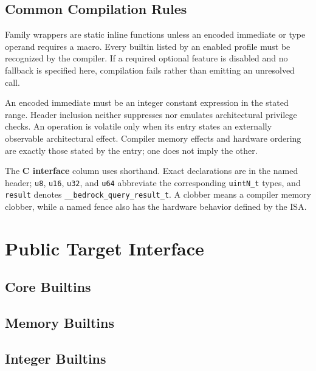 \documentclass[10pt,twoside]{article}
\newcommand{\compilerctype}[1]{\texttt{\detokenize{#1}}}
\begin{document}


\subsection{Common Compilation Rules}
Family wrappers are static inline functions unless an encoded immediate or
type operand requires a macro. Every builtin listed by an enabled profile must
be recognized by the compiler. If a required optional feature is disabled and
no fallback is specified here, compilation fails rather than emitting an
unresolved call.

An encoded immediate must be an integer constant expression in the stated
range. Header inclusion neither suppresses nor emulates architectural
privilege checks. An operation is volatile only when its entry states an
externally observable architectural effect. Compiler memory effects and
hardware ordering are exactly those stated by the entry; one does not imply
the other.

The \textbf{C interface} column uses
\compilerctype{result(arguments)} shorthand. Exact declarations are in the
named header; \texttt{u8}, \texttt{u16}, \texttt{u32}, and \texttt{u64}
abbreviate the corresponding \texttt{uintN\_t} types, and \texttt{result}
denotes \texttt{\_\_bedrock\_query\_result\_t}. A clobber means a compiler
memory clobber, while a named fence also has the hardware behavior defined by
the ISA.

\section{Public Target Interface}\label{page:public-target-interface}

\subsection{Core Builtins}


\subsection{Memory Builtins}


\subsection{Integer Builtins}

\end{document}
